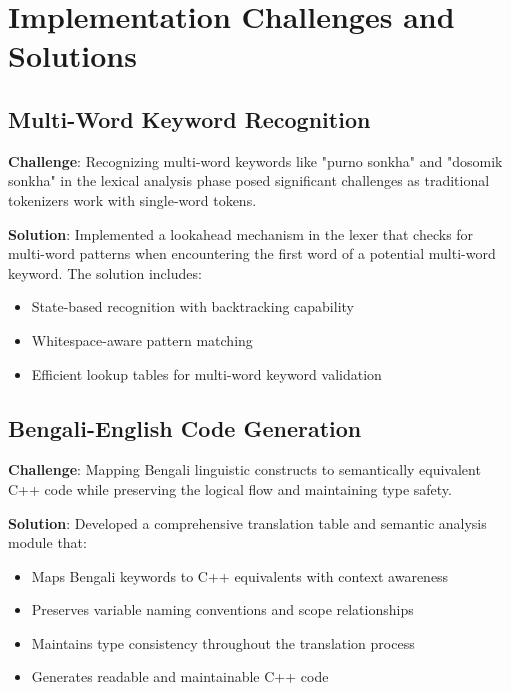 \documentclass[12pt,a4paper]{article}
\begin{document}
\section{Implementation Challenges and Solutions}

\subsection{Multi-Word Keyword Recognition}

\textbf{Challenge}: Recognizing multi-word keywords like "purno sonkha" and "dosomik sonkha" in the lexical analysis phase posed significant challenges as traditional tokenizers work with single-word tokens.

\textbf{Solution}: Implemented a lookahead mechanism in the lexer that checks for multi-word patterns when encountering the first word of a potential multi-word keyword. The solution includes:

\begin{itemize}[itemsep=2pt]
    \item State-based recognition with backtracking capability
    \item Whitespace-aware pattern matching
    \item Efficient lookup tables for multi-word keyword validation
\end{itemize}

\subsection{Bengali-English Code Generation}

\textbf{Challenge}: Mapping Bengali linguistic constructs to semantically equivalent C++ code while preserving the logical flow and maintaining type safety.

\textbf{Solution}: Developed a comprehensive translation table and semantic analysis module that:

\begin{itemize}[itemsep=2pt]
    \item Maps Bengali keywords to C++ equivalents with context awareness
    \item Preserves variable naming conventions and scope relationships
    \item Maintains type consistency throughout the translation process
    \item Generates readable and maintainable C++ code
\end{itemize}
\end{document}
